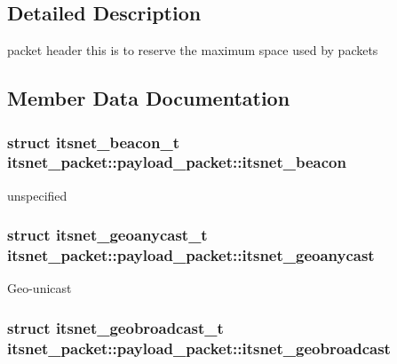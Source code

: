 \subsection{\-Detailed \-Description}
packet header this is to reserve the maximum space used by packets 

\subsection{\-Member \-Data \-Documentation}
\hypertarget{unionitsnet__packet_1_1payload__packet_a8bc8f430f8f46b9cee9b118b7131bca1}{
\subsubsection[{itsnet\-\_\-beacon}]{\setlength{\rightskip}{0pt plus 5cm}struct {\bf itsnet\-\_\-beacon\-\_\-t} {\bf itsnet\-\_\-packet\-::payload\-\_\-packet\-::itsnet\-\_\-beacon}}}\label{unionitsnet__packet_1_1payload__packet_a8bc8f430f8f46b9cee9b118b7131bca1}
unspecified \hypertarget{unionitsnet__packet_1_1payload__packet_a2d16b9d7f7229021de254d8f339f169b}{
\subsubsection[{itsnet\-\_\-geoanycast}]{\setlength{\rightskip}{0pt plus 5cm}struct {\bf itsnet\-\_\-geoanycast\-\_\-t} {\bf itsnet\-\_\-packet\-::payload\-\_\-packet\-::itsnet\-\_\-geoanycast}}}\label{unionitsnet__packet_1_1payload__packet_a2d16b9d7f7229021de254d8f339f169b}
\-Geo-\/unicast \hypertarget{unionitsnet__packet_1_1payload__packet_aff53cbb7dee96834ac86a8b67858afd8}{
\subsubsection[{itsnet\-\_\-geobroadcast}]{\setlength{\rightskip}{0pt plus 5cm}struct {\bf itsnet\-\_\-geobroadcast\-\_\-t} {\bf itsnet\-\_\-packet\-::payload\-\_\-packet\-::itsnet\-\_\-geobroadcast}}}\label{unionitsnet__packet_1_1payload__packet_aff53cbb7dee96834ac86a8b67858afd8}
